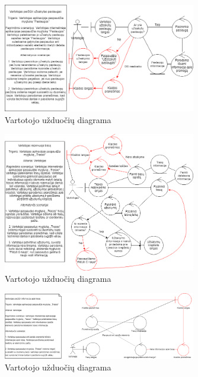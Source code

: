 \documentclass[oneside]{VUMIFPSkursinis}
\begin{document}
			\begin{figure}[h]
    				\centering
    				\includegraphics[width=0.75\textwidth]{rob7.png}
    				\caption{Vartotojo užduočių diagrama}
    				\label{fig:VartotojoUseCasel}
			\end{figure}

			\begin{figure}[h]
    				\centering
    				\includegraphics[width=0.75\textwidth]{rob8.png}
    				\caption{Vartotojo užduočių diagrama}
    				\label{fig:VartotojoUseCasel}
			\end{figure}

			\begin{figure}[h]
    				\centering
    				\includegraphics[width=0.75\textwidth]{rob9.png}
    				\caption{Vartotojo užduočių diagrama}
    				\label{fig:VartotojoUseCasel}
			\end{figure}
\end{document}
